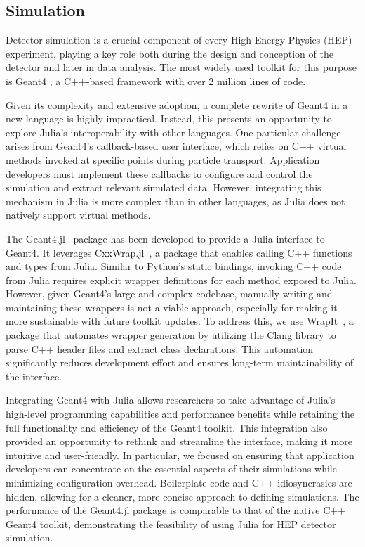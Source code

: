 \documentclass{webofc}
\begin{document}
\subsection{Simulation}
\label{sec:simulation}

Detector simulation is a crucial component of every High Energy Physics (HEP)
experiment, playing a key role both during the design and conception of the
detector and later in data analysis. The most widely used toolkit for this
purpose is Geant4 \cite{GEANT4:2002zbu}, a C++-based framework with over 2
million lines of code.

Given its complexity and extensive adoption, a complete rewrite of Geant4 in a
new language is highly impractical. Instead, this presents an opportunity to
explore Julia's interoperability with other languages. One particular challenge
arises from Geant4's callback-based user interface, which relies on C++ virtual
methods invoked at specific points during particle transport. Application
developers must implement these callbacks to configure and control the
simulation and extract relevant simulated data. However, integrating this
mechanism in Julia is more complex than in other languages, as Julia does not
natively support virtual methods.

The Geant4.jl~\cite{geant4-jl-github} package has been developed to provide a
Julia interface to Geant4. It leverages CxxWrap.jl~\cite{CxxWrap.jl}, a
package that enables calling C++ functions and types from Julia. Similar to
Python's static bindings, invoking C++ code from Julia requires explicit wrapper
definitions for each method exposed to Julia. However, given Geant4's large and
complex codebase, manually writing and maintaining these wrappers is not a
viable approach, especially for making it more sustainable with future toolkit
updates. To address this, we use WrapIt~\cite{wrapit-github}, a package that
automates wrapper generation by utilizing the Clang library to parse C++ header
files and extract class declarations. This automation significantly reduces
development effort and ensures long-term maintainability of the interface.

Integrating Geant4 with Julia allows researchers to take advantage of Julia's
high-level programming capabilities and performance benefits while retaining the
full functionality and efficiency of the Geant4 toolkit. This integration also
provided an opportunity to rethink and streamline the interface, making it more
intuitive and user-friendly. In particular, we focused on ensuring that
application developers can concentrate on the essential aspects of their
simulations while minimizing configuration overhead. Boilerplate code and C++
idiosyncrasies are hidden, allowing for a cleaner, more concise approach to
defining simulations. The performance of the Geant4.jl package is comparable to
that of the native C++ Geant4 toolkit, demonstrating the feasibility of using
Julia for HEP detector simulation.
\end{document}

